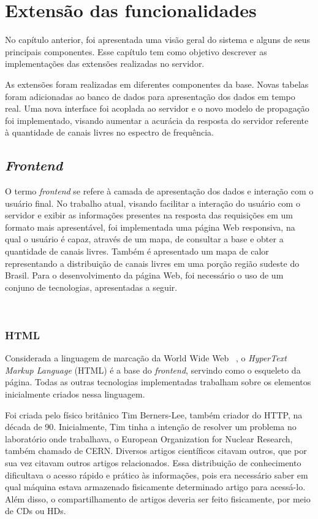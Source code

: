 \chapter{Extensão das funcionalidades}

No capítulo anterior, foi apresentada uma visão geral do sistema e alguns de seus principais componentes. Esse capítulo tem como objetivo descrever as implementações das extensões realizadas no servidor.

As extensões foram realizadas em diferentes componentes da base. Novas tabelas foram adicionadas ao banco de dados para apresentação dos dados em tempo real. Uma nova interface foi acoplada ao servidor e o novo modelo de propagação foi implementado, visando aumentar a acurácia da resposta do servidor referente à quantidade de canais livres no espectro de frequência.

\section{\textit{Frontend} }

O termo \textit{frontend} se refere à camada de apresentação dos dados e interação com o usuário final. No trabalho atual, visando facilitar a interação do usuário com o servidor e exibir as informações presentes na resposta das requisições em um formato mais apresentável, foi implementada uma página Web responsiva, na qual o usuário é capaz, através de um mapa, de consultar a base e obter a quantidade de canais livres. Também é apresentado um mapa de calor representando a distribuição de canais livres em uma porção região sudeste do Brasil.
Para o desenvolvimento da página Web, foi necessário o uso de um conjuno de tecnologias, apresentadas a seguir.

\
\subsection{HTML}

Considerada a linguagem de marcação da World Wide Web ~\cite{htmlw3cs}, o \textit{HyperText Markup Language} (HTML) é a base do \textit{frontend}, servindo como o esqueleto da página. Todas as outras tecnologias implementadas trabalham sobre os elementos inicialmente criados nessa linguagem.

Foi criada pelo físico britânico Tim Berners-Lee, também criador do HTTP,
na década de 90. Inicialmente, Tim tinha a intenção de resolver um problema no laboratório onde trabalhava, o European Organization for Nuclear Research, também chamado de CERN. Diversos artigos científicos citavam outros, que por sua vez citavam outros artigos relacionados. Essa distribuição de conhecimento dificultava o acesso rápido e prático às informações, pois era necessário saber em qual máquina estava armazenado fisicamente determinado artigo para acessá-lo. Além disso, o compartilhamento de artigos deveria ser feito fisicamente, por meio de CDs ou HDs.

